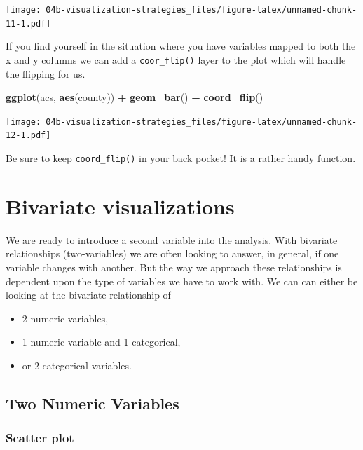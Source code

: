 \documentclass[
]{book}
\newenvironment{Shaded}{\begin{snugshade}}{\end{snugshade}}
\newcommand{\KeywordTok}[1]{\textcolor[rgb]{0.13,0.29,0.53}{\textbf{#1}}}
\newcommand{\NormalTok}[1]{#1}
\newcommand{\OperatorTok}[1]{\textcolor[rgb]{0.81,0.36,0.00}{\textbf{#1}}}
\newcommand{\StringTok}[1]{\textcolor[rgb]{0.31,0.60,0.02}{#1}}
\providecommand{\tightlist}{%
  \setlength{\itemsep}{0pt}\setlength{\parskip}{0pt}}
\begin{document}
\texttt{[image: 04b-visualization-strategies\_files/figure-latex/unnamed-chunk-11-1.pdf]}

If you find yourself in the situation where you have variables mapped to both the x and y columns we can add a \texttt{coor\_flip()} layer to the plot which will handle the flipping for us.

\begin{Shaded}
\begin{Highlighting}[]
\KeywordTok{ggplot}\NormalTok{(acs, }\KeywordTok{aes}\NormalTok{(county)) }\OperatorTok{+}
\StringTok{  }\KeywordTok{geom\_bar}\NormalTok{() }\OperatorTok{+}
\StringTok{  }\KeywordTok{coord\_flip}\NormalTok{()}
\end{Highlighting}
\end{Shaded}

\texttt{[image: 04b-visualization-strategies\_files/figure-latex/unnamed-chunk-12-1.pdf]}

Be sure to keep \texttt{coord\_flip()} in your back pocket! It is a rather handy function.

\hypertarget{bivariate-visualizations}{%
\section{Bivariate visualizations}\label{bivariate-visualizations}}

We are ready to introduce a second variable into the analysis. With bivariate relationships (two-variables) we are often looking to answer, in general, if one variable changes with another. But the way we approach these relationships is dependent upon the type of variables we have to work with. We can can either be looking at the bivariate relationship of

\begin{itemize}
\tightlist
\item
  2 numeric variables,
\item
  1 numeric variable and 1 categorical,
\item
  or 2 categorical variables.
\end{itemize}

\hypertarget{two-numeric-variables}{%
\subsection{Two Numeric Variables}\label{two-numeric-variables}}

\hypertarget{scatter-plot}{%
\subsubsection{Scatter plot}\label{scatter-plot}}
\end{document}
